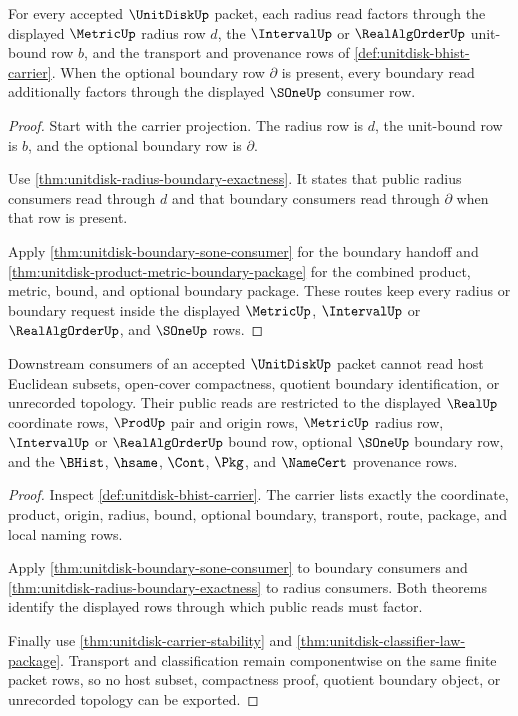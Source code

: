 \begin{theorem}
\label{thm:unitdisk-scoped-radius-boundary-route}
For every accepted $\UnitDiskUp$ packet, each radius read factors through the displayed $\MetricUp$ radius row $d$, the $\IntervalUp$ or $\RealAlgOrderUp$ unit-bound row $b$, and the transport and provenance rows of \autoref{def:unitdisk-bhist-carrier}. When the optional boundary row $\partial$ is present, every boundary read additionally factors through the displayed $\SOneUp$ consumer row.
\end{theorem}
\begin{proof}
Start with the carrier projection. The radius row is $d$, the unit-bound row is $b$, and the optional boundary row is $\partial$.

Use \autoref{thm:unitdisk-radius-boundary-exactness}. It states that public radius consumers read through $d$ and that boundary consumers read through $\partial$ when that row is present.

Apply \autoref{thm:unitdisk-boundary-sone-consumer} for the boundary handoff and \autoref{thm:unitdisk-product-metric-boundary-package} for the combined product, metric, bound, and optional boundary package. These routes keep every radius or boundary request inside the displayed $\MetricUp$, $\IntervalUp$ or $\RealAlgOrderUp$, and $\SOneUp$ rows.
\end{proof}

\begin{theorem}
\label{thm:unitdisk-scoped-consumer-nonescape}
Downstream consumers of an accepted $\UnitDiskUp$ packet cannot read host Euclidean subsets, open-cover compactness, quotient boundary identification, or unrecorded topology. Their public reads are restricted to the displayed $\RealUp$ coordinate rows, $\ProdUp$ pair and origin rows, $\MetricUp$ radius row, $\IntervalUp$ or $\RealAlgOrderUp$ bound row, optional $\SOneUp$ boundary row, and the $\BHist$, $\hsame$, $\Cont$, $\Pkg$, and $\NameCert$ provenance rows.
\end{theorem}
\begin{proof}
Inspect \autoref{def:unitdisk-bhist-carrier}. The carrier lists exactly the coordinate, product, origin, radius, bound, optional boundary, transport, route, package, and local naming rows.

Apply \autoref{thm:unitdisk-boundary-sone-consumer} to boundary consumers and \autoref{thm:unitdisk-radius-boundary-exactness} to radius consumers. Both theorems identify the displayed rows through which public reads must factor.

Finally use \autoref{thm:unitdisk-carrier-stability} and \autoref{thm:unitdisk-classifier-law-package}. Transport and classification remain componentwise on the same finite packet rows, so no host subset, compactness proof, quotient boundary object, or unrecorded topology can be exported.
\end{proof}

